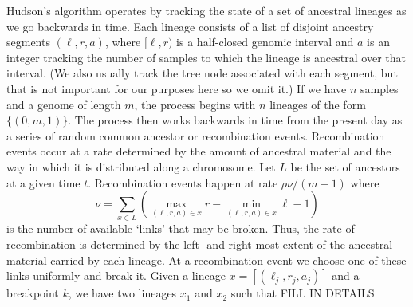\documentclass{article}
\begin{document}
Hudson's algorithm operates by tracking the state of a set of ancestral
lineages as we go backwards in time.
%
Each lineage consists of a list of
disjoint ancestry segments $(\ell, r, a)$, where
$[\ell, r)$ is a half-closed genomic interval and $a$ is an integer
tracking the number of samples to which the lineage is ancestral over that interval.
(We also usually track the tree node associated with each segment, but
that is not important for our purposes here so we omit it.)
If we have $n$ samples and a genome of length $m$, the process begins with $n$ lineages
of the form $\{(0, m, 1)\}$. The process then works backwards in time from
the present day as a series of random common ancestor or recombination events.
Recombination events occur at a rate determined by the amount of ancestral material and
the way in which it is distributed along a chromosome.
Let $L$ be the set of ancestors at a given time $t$. Recombination events
happen at rate $\rho \nu / (m - 1)$ where
\[
\nu = \sum_{x \in L}\left( \max_{(\ell, r, a) \in x}r
    - \min_{(\ell, r, a) \in x}\ell - 1 \right)
\]
is the number of available `links' that may be broken. Thus, the rate of
recombination is determined by the left- and right-most extent of the
ancestral material carried by each lineage. At a recombination
event we choose one of these links uniformly and break it. Given a lineage
$x = [(\ell_j, r_j, a_j)]$ and a breakpoint $k$, we have two lineages
$x_1$ and $x_2$ such that FILL IN DETAILS
\end{document}
